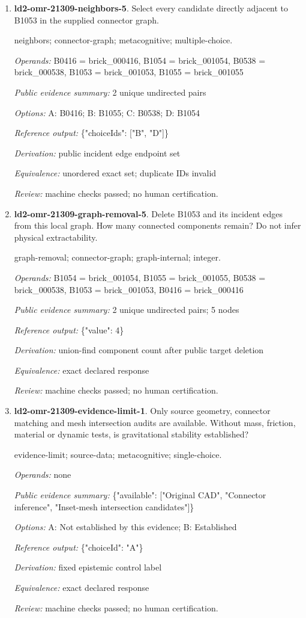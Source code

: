 \begin{enumerate}
\item \textbf{ld2-omr-21309-neighbors-5}. Select every candidate directly adjacent to B1053 in the supplied connector graph.
\par{\small neighbors; connector-graph; metacognitive; multiple-choice.\par\textit{Operands:} B0416 = brick\_000416, B1054 = brick\_001054, B0538 = brick\_000538, B1053 = brick\_001053, B1055 = brick\_001055\par\textit{Public evidence summary:} 2 unique undirected pairs\par\textit{Options:} A: B0416; B: B1055; C: B0538; D: B1054\par\textit{Reference output:} \{"choiceIds": ["B", "D"]\}\par\textit{Derivation:} public incident edge endpoint set\par\textit{Equivalence:} unordered exact set; duplicate IDs invalid\par\textit{Review:} machine checks passed; no human certification.}
\item \textbf{ld2-omr-21309-graph-removal-5}. Delete B1053 and its incident edges from this local graph. How many connected components remain? Do not infer physical extractability.
\par{\small graph-removal; connector-graph; graph-internal; integer.\par\textit{Operands:} B1054 = brick\_001054, B1055 = brick\_001055, B0538 = brick\_000538, B1053 = brick\_001053, B0416 = brick\_000416\par\textit{Public evidence summary:} 2 unique undirected pairs; 5 nodes\par\textit{Reference output:} \{"value": 4\}\par\textit{Derivation:} union-find component count after public target deletion\par\textit{Equivalence:} exact declared response\par\textit{Review:} machine checks passed; no human certification.}
\item \textbf{ld2-omr-21309-evidence-limit-1}. Only source geometry, connector matching and mesh intersection audits are available. Without mass, friction, material or dynamic tests, is gravitational stability established?
\par{\small evidence-limit; source-data; metacognitive; single-choice.\par\textit{Operands:} none\par\textit{Public evidence summary:} \{"available": ["Original CAD", "Connector inference", "Inset-mesh intersection candidates"]\}\par\textit{Options:} A: Not established by this evidence; B: Established\par\textit{Reference output:} \{"choiceId": "A"\}\par\textit{Derivation:} fixed epistemic control label\par\textit{Equivalence:} exact declared response\par\textit{Review:} machine checks passed; no human certification.}

\end{enumerate}
